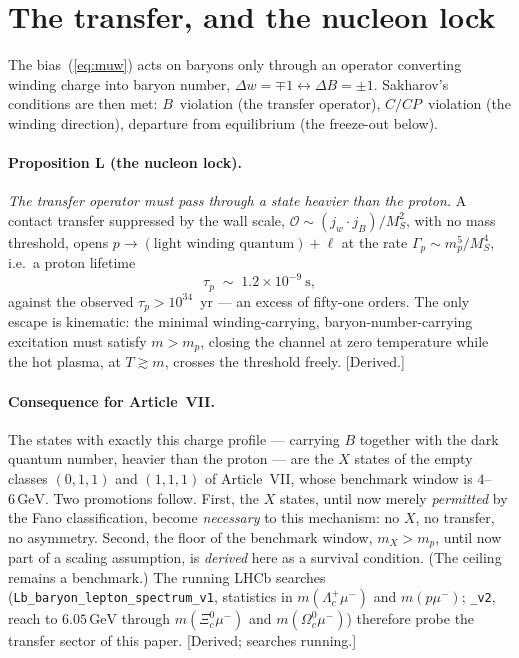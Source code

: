 \documentclass[11pt,a4paper]{article}
\newcommand{\GeV}{\,\mathrm{GeV}}
\begin{document}
\section{The transfer, and the nucleon lock}
\label{sec:lock}

The bias~(\ref{eq:muw}) acts on baryons only through an operator converting
winding charge into baryon number, $\Delta w=\mp1\leftrightarrow\Delta B=\pm1$.
Sakharov's conditions are then met: $B$~violation (the transfer operator),
$C/CP$~violation (the winding direction), departure from equilibrium (the
freeze-out below).

\paragraph{Proposition L (the nucleon lock).}
\textit{The transfer operator must pass through a state heavier than the
proton.}
A contact transfer suppressed by the wall scale, $\mathcal{O}\sim
(j_w\!\cdot\!j_B)/M_S^2$, with no mass threshold, opens $p\to(\text{light
winding quantum})+\ell$ at the rate $\Gamma_p\sim m_p^5/M_S^4$, i.e.\ a proton
lifetime
\begin{equation}
\tau_p \;\sim\; 1.2\times10^{-9}\ \mathrm{s},
\end{equation}
against the observed $\tau_p>10^{34}$~yr --- an excess of fifty-one orders. The
only escape is kinematic: the minimal winding-carrying, baryon-number-carrying
excitation must satisfy $m>m_p$, closing the channel at zero temperature while
the hot plasma, at $T\gtrsim m$, crosses the threshold freely.
[Derived.]

\paragraph{Consequence for Article~VII.}
The states with exactly this charge profile --- carrying $B$ together with the
dark quantum number, heavier than the proton --- are the $X$ states of the
empty classes $(0,1,1)$ and $(1,1,1)$ of Article~VII, whose benchmark window is
$4$--$6\GeV$. Two promotions follow. First, the $X$ states, until now merely
\emph{permitted} by the Fano classification, become \emph{necessary} to this
mechanism: no $X$, no transfer, no asymmetry. Second, the floor of the
benchmark window, $m_X>m_p$, until now part of a scaling assumption, is
\emph{derived} here as a survival condition. (The ceiling remains a benchmark.)
The running LHCb searches
(\texttt{Lb\_baryon\_lepton\_spectrum\_v1}, statistics in
$m(\Lambda_c^+\mu^-)$ and $m(p\mu^-)$;
\texttt{\_v2}, reach to $6.05\GeV$ through $m(\Xi_c^0\mu^-)$ and
$m(\Omega_c^0\mu^-)$) therefore probe the transfer sector of this paper.
[Derived; searches running.]
\end{document}
